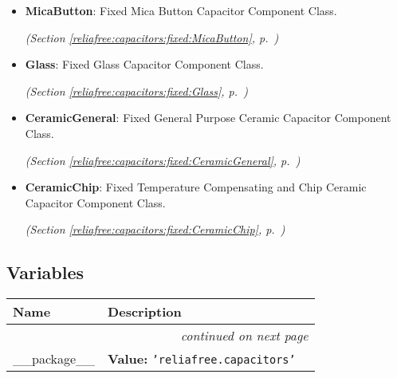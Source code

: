 \begin{itemize}
  \item \textbf{MicaButton}: Fixed Mica Button Capacitor Component Class.



  \textit{(Section \ref{reliafree:capacitors:fixed:MicaButton}, p.~\pageref{reliafree:capacitors:fixed:MicaButton})}

  \item \textbf{Glass}: Fixed Glass Capacitor Component Class.



  \textit{(Section \ref{reliafree:capacitors:fixed:Glass}, p.~\pageref{reliafree:capacitors:fixed:Glass})}

  \item \textbf{CeramicGeneral}: Fixed General Purpose Ceramic Capacitor Component Class.



  \textit{(Section \ref{reliafree:capacitors:fixed:CeramicGeneral}, p.~\pageref{reliafree:capacitors:fixed:CeramicGeneral})}

  \item \textbf{CeramicChip}: Fixed Temperature Compensating and Chip Ceramic Capacitor Component Class.



  \textit{(Section \ref{reliafree:capacitors:fixed:CeramicChip}, p.~\pageref{reliafree:capacitors:fixed:CeramicChip})}

\end{itemize}


  \subsection{Variables}

    \vspace{-1cm}
\hspace{\varindent}\begin{longtable}{|p{\varnamewidth}|p{\vardescrwidth}|l}
\cline{1-2}
\cline{1-2} \centering \textbf{Name} & \centering \textbf{Description}& \\
\cline{1-2}
\endhead\cline{1-2}\multicolumn{3}{r}{\small\textit{continued on next page}}\\\endfoot\cline{1-2}
\endlastfoot\raggedright \_\-\_\-p\-a\-c\-k\-a\-g\-e\-\_\-\_\- & \raggedright \textbf{Value:} 
{\tt \texttt{'}\texttt{reliafree.capacitors}\texttt{'}}&\\
\cline{1-2}
\end{longtable}

